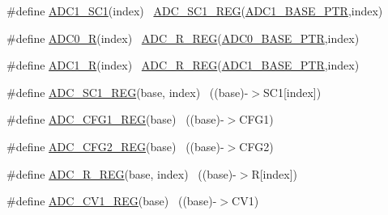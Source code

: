 \begin{DoxyCompactItemize}
\#define \hyperlink{group___a_d_c___register___accessor___macros_ga60b62b4a213722b03db78e850f5d5894}{A\+D\+C1\+\_\+\+S\+C1}(index)                                                ~\hyperlink{group___a_d_c___register___accessor___macros_ga222b4f9dbc62d3e7cdc7fab81d736b1f}{A\+D\+C\+\_\+\+S\+C1\+\_\+\+R\+EG}(\hyperlink{group___a_d_c___peripheral_ga7fb56938ede79eea2065c4294db3b2d3}{A\+D\+C1\+\_\+\+B\+A\+S\+E\+\_\+\+P\+TR},index)
\item 
\#define \hyperlink{group___a_d_c___register___accessor___macros_gaa8fc1f5b1e0ab4d1105f4f5b85f50d61}{A\+D\+C0\+\_\+R}(index)                                                    ~\hyperlink{group___a_d_c___register___accessor___macros_gaa73e4be773e5276ec891d3ae1cfd7944}{A\+D\+C\+\_\+\+R\+\_\+\+R\+EG}(\hyperlink{group___a_d_c___peripheral_ga6cec2f227a3a37a9fccaa830740f1f5e}{A\+D\+C0\+\_\+\+B\+A\+S\+E\+\_\+\+P\+TR},index)
\item 
\#define \hyperlink{group___a_d_c___register___accessor___macros_ga4de64c34170dcafcbae5e713a9ca6903}{A\+D\+C1\+\_\+R}(index)                                                    ~\hyperlink{group___a_d_c___register___accessor___macros_gaa73e4be773e5276ec891d3ae1cfd7944}{A\+D\+C\+\_\+\+R\+\_\+\+R\+EG}(\hyperlink{group___a_d_c___peripheral_ga7fb56938ede79eea2065c4294db3b2d3}{A\+D\+C1\+\_\+\+B\+A\+S\+E\+\_\+\+P\+TR},index)
\item 
\#define \hyperlink{group___a_d_c___register___accessor___macros_ga222b4f9dbc62d3e7cdc7fab81d736b1f}{A\+D\+C\+\_\+\+S\+C1\+\_\+\+R\+EG}(base,  index)                                ~((base)-\/$>$S\+C1\mbox{[}index\mbox{]})
\item 
\#define \hyperlink{group___a_d_c___register___accessor___macros_ga1d379c53bd79f7568c89802f14ae147a}{A\+D\+C\+\_\+\+C\+F\+G1\+\_\+\+R\+EG}(base)                                          ~((base)-\/$>$C\+F\+G1)
\item 
\#define \hyperlink{group___a_d_c___register___accessor___macros_ga95c3a7cebd9170a6d22b0176e8167899}{A\+D\+C\+\_\+\+C\+F\+G2\+\_\+\+R\+EG}(base)                                          ~((base)-\/$>$C\+F\+G2)
\item 
\#define \hyperlink{group___a_d_c___register___accessor___macros_gaa73e4be773e5276ec891d3ae1cfd7944}{A\+D\+C\+\_\+\+R\+\_\+\+R\+EG}(base,  index)                                    ~((base)-\/$>$R\mbox{[}index\mbox{]})
\item 
\#define \hyperlink{group___a_d_c___register___accessor___macros_gaf1a44ade9e2d74c7a84112c805324a85}{A\+D\+C\+\_\+\+C\+V1\+\_\+\+R\+EG}(base)                                            ~((base)-\/$>$C\+V1)

\end{DoxyCompactItemize}
